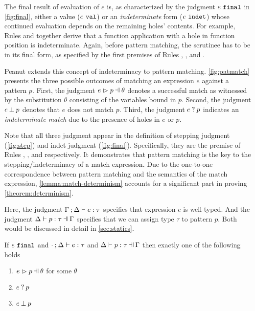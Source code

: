 The final result of evaluation of $e$ is, as characterized by the judgment $e ~\mathtt{final}$ in \autoref{fig:final}, either a value ($e ~\mathtt{val}$) or an \emph{indeterminate} form ($e ~\mathtt{indet}$) whose continued evaluation depends on the remaining holes' contents. For example, Rules \IAp and \IEHole together derive that a function application with a hole in function position is indeterminate. 
Again, before pattern matching, the scrutinee has to be in its final form, as specified by the first premises of Rules \ITSuccMatch, \ITFailMatch, and \IMatch.




Peanut extends this concept of indeterminacy to pattern matching.
\autoref{fig:patmatch} presents the three possible outcomes of matching an expression $e$ against a pattern $p$. 
First, the judgment $\hpatmatch{e}{p}{\theta}$ denotes a successful match as witnessed by the substitution $\theta$ consisting of the variables bound in $p$. Second, the judgment $e \mathbin{\bot} p$ denotes that $e$ does not match $p$. Third, the judgment $e \mathbin{?} p$ indicates an \emph{indeterminate match} due to the presence of holes in $e$ or $p$. 

Note that all three judgment appear in the definition of stepping judgment (\autoref{fig:step}) and indet judgment (\autoref{fig:final}). Specifically, they are the premise of Rules \ITSuccMatch, \ITFailMatch, and \IMatch respectively. It demonstrates that pattern matching is the key to the stepping/indeterminacy of a match expression.
Due to the one-to-one correspondence between pattern matching and the semantics of the match expression, \autoref{lemma:match-determinism} accounts for a significant part in proving \autoref{theorem:determinism}.

Here, the judgment $\Gamma \mathbin{;} \Delta \vdash e : \tau$ specifies that expression $e$ is well-typed. And the judgment $\hpattyp{p}{\tau}{\Gamma}{\Delta}$ specifies that we can assign type $\tau$ to pattern $p$. Both would be discussed in detail in \autoref{sec:statics}.
\begin{lemma}
  \label{lemma:match-determinism}
  If $e ~\mathtt{final}$ and $\cdot \mathbin{;} \Delta \vdash e : \tau$ and $\hpattyp{p}{\tau}{\Gamma}{\Delta}$ then exactly one of the following holds
  \begin{enumerate}
    \item $\hpatmatch{e}{p}{\theta}$ for some $\theta$
    \item $e \mathbin{?} p$
    \item $e \mathbin{\bot} p$
  \end{enumerate}
\end{lemma}

